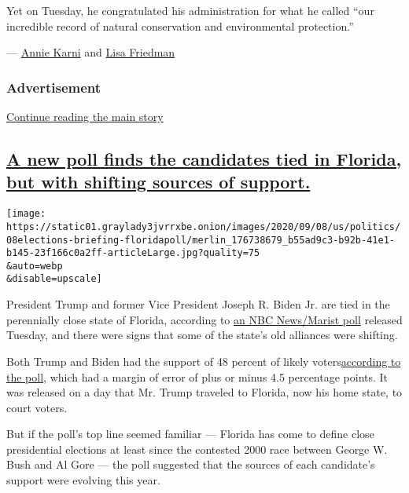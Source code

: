 Yet on Tuesday, he congratulated his administration for what he called
``our incredible record of natural conservation and environmental
protection.''

--- \href{https://www.nytimes3xbfgragh.onion/by/annie-karni}{Annie
Karni} and
\href{https://www.nytimes3xbfgragh.onion/by/lisa-friedman}{Lisa
Friedman}

\hypertarget{advertisement}{%
\subsubsection{Advertisement}\label{advertisement}}

\protect\hyperlink{after-dfp-ad-mid1}{Continue reading the main story}

\hypertarget{a-new-poll-finds-the-candidates-tied-in-florida-but-with-shifting-sources-of-support}{%
\subsection{\texorpdfstring{\protect\hyperlink{a-new-poll-finds-the-candidates-tied-in-florida-but-with-shifting-sources-of-support}{A
new poll finds the candidates tied in Florida, but with shifting sources
of
support.}}{A new poll finds the candidates tied in Florida, but with shifting sources of support.}}\label{a-new-poll-finds-the-candidates-tied-in-florida-but-with-shifting-sources-of-support}}

\texttt{[image: https://static01.graylady3jvrrxbe.onion/images/2020/09/08/us/politics/08elections-briefing-floridapoll/merlin\_176738679\_b55ad9c3-b92b-41e1-b145-23f166c0a2ff-articleLarge.jpg?quality=75\\\&auto=webp\\\&disable=upscale]}

President Trump and former Vice President Joseph R. Biden Jr. are tied
in the perennially close state of Florida, according to
\href{https://www.nbcnews.com/politics/meet-the-press/poll-trump-biden-are-tied-battleground-florida-n1239510}{an
NBC News/Marist poll} released Tuesday, and there were signs that some
of the state's old alliances were shifting.

Both Trump and Biden had the support of 48 percent of likely
voters\href{https://www.documentcloud.org/documents/7203771-NBC-News-Marist-Poll-FL-Annotated-Questionnaire.html}{according
to the poll}, which had a margin of error of plus or minus 4.5
percentage points. It was released on a day that Mr. Trump traveled to
Florida, now his home state, to court voters.

But if the poll's top line seemed familiar --- Florida has come to
define close presidential elections at least since the contested 2000
race between George W. Bush and Al Gore --- the poll suggested that the
sources of each candidate's support were evolving this year.

